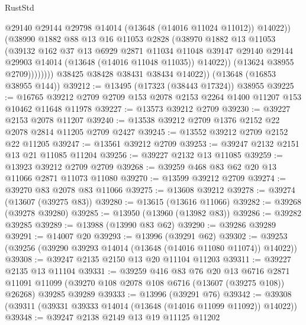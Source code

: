 \begin{lexlean}{RustStd}
\begin{coremodule}
                        @29140
                        @29144
                        @29798
                        @14014
                        (@13648 (@14016 @11024 @11012))
                        @14022))
                    (@38990
                      @1882
                      @88
                      @13
                      @16
                      @11053
                      @2828
                      (@38970
                        @1882
                        @13
                        @11053
                        (@39132
                          @162
                          @37
                          @13
                          @6929
                          @2871
                          @11034
                          @11048
                          @39147
                          @29140
                          @29144
                          @29903
                          @14014
                          (@13648 (@14016 @11048 @11035))
                          @14022))
                      (@13624 @38955 @2709))))))))
        @38425
        @38428
        @38431
        @38434
        @14022))
    (@13648 (@16853 @38955 @144))
@39212 := @13495 (@17323 (@38443 @17324)) @38955
@39225 := @16765 @39212 @2709 @2709 @153 @2078 @2153 @2264 @1400 @11207 @153 @10462 @11648 @11978
@39227 := @13573 @39212 @2709
@39230 := @39227 @2153 @2078 @11207
@39240 := @13538 @39212 @2709 @1376 @2152 @22 @2078 @2814 @11205 @2709 @2427
@39245 := @13552 @39212 @2709 @2152 @22 @11205
@39247 := @13561 @39212 @2709
@39253 := @39247 @2132 @2151 @13 @21 @11085 @11204
@39256 := @39227 @2132 @13 @11085
@39259 := @13923 @39212 @2709 @2709
@39268 := @39259 @468 @83 @62 @20 @13 @11066 @2871 @11073 @11080
@39270 := @13599 @39212 @2709
@39274 := @39270 @83 @2078 @83 @11066
@39275 := @13608 @39212
@39278 := @39274 (@13607 (@39275 @83))
@39280 := @13615 (@13616 @11066)
@39282 := @39268 (@39278 @39280)
@39285 := @13950 (@13960 (@13982 @83))
@39286 := @39282 @39285
@39289 := @13988 (@13990 @83 @62)
@39290 := @39286 @39289
@39291 := @14007 @20
@39293 := @13996 (@39291 @62)
@39302 := @39253 (@39256 (@39290 @39293 @14014 (@13648 (@14016 @11080 @11074)) @14022))
@39308 := @39247 @2135 @2150 @13 @20 @11104 @11203
@39311 := @39227 @2135 @13 @11104
@39331 := @39259
    @416
    @83
    @76
    @20
    @13
    @6716
    @2871
    @11091
    @11099
    (@39270 @108 @2078 @108 @6716 (@13607 (@39275 @108)) @26268)
    @39285
    @39289
@39333 := @13996 (@39291 @76)
@39342 := @39308 (@39311 (@39331 @39333 @14014 (@13648 (@14016 @11099 @11092)) @14022))
@39348 := @39247 @2138 @2149 @13 @19 @11125 @11202

\end{coremodule}
\end{lexlean}
